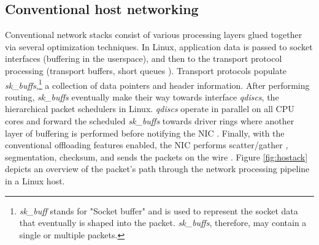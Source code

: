 \subsection{Conventional host networking}
Conventional network stacks consist of various processing layers glued together via several optimization techniques. In Linux, application data is passed to socket interfaces (buffering in the userspace), and then to the transport protocol processing (transport buffers, short queues \cite{tsq}). Transport protocols populate \textit{sk\_buffs},\footnote{\textit{sk\_buff} stands for "Socket buffer" and is used to represent the socket data that eventually is shaped into the packet. \textit{sk\_buffs}, therefore, may contain a single or multiple packets.} a collection of data pointers and  header information. After performing routing, \textit{sk\_buffs} eventually make their way towards interface \textit{qdiscs}, the hierarchical packet schedulers in Linux. \textit{qdiscs} operate in parallel on all CPU cores and forward the scheduled \textit{sk\_buffs} towards driver rings where another layer of buffering is performed before notifying the NIC \cite{titan}. Finally, with the conventional offloading features enabled, the NIC performs scatter/gather \cite{breakfast}, segmentation, checksum, and sends the packets on the wire \cite{overheads}. Figure \ref{fig:hostack} depicts an overview of the packet's path through the network processing pipeline in a Linux host.



